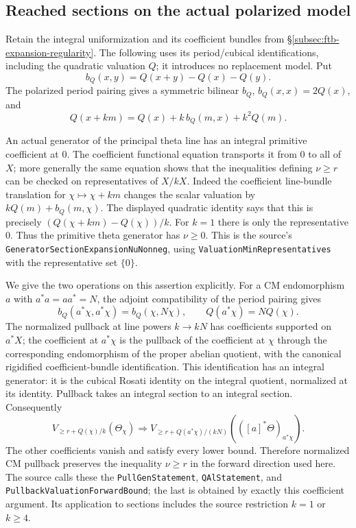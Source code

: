 \subsection{Reached sections on the actual polarized model}
\label{subsec:ftb-reached-sections}

Retain the integral uniformization and its coefficient bundles from
\S\ref{subsec:ftb-expansion-regularity}.
The following uses its period/cubical identifications, including the
quadratic valuation \(Q\); it introduces no replacement model.
Put
\[
 b_Q(x,y)=Q(x+y)-Q(x)-Q(y).
\]
The polarized period pairing gives a symmetric bilinear \(b_Q\),
\(b_Q(x,x)=2Q(x)\), and
\[
 Q(x+km)=Q(x)+k\,b_Q(m,x)+k^2Q(m).
\]

An actual generator of the principal theta line has an integral
primitive coefficient at \(0\).
The coefficient functional equation transports it from \(0\) to all
of \(X\); more generally the same equation shows that the inequalities
defining \(\nu\ge r\) can be checked on representatives of \(X/kX\).
Indeed the coefficient line-bundle translation for
\(\chi\mapsto\chi+km\) changes the scalar valuation by
\(kQ(m)+b_Q(m,\chi)\).  The displayed quadratic identity says that
this is precisely
\((Q(\chi+km)-Q(\chi))/k\).
For \(k=1\) there is only the representative \(0\).
Thus the primitive theta generator has \(\nu\ge0\).
This is the source's
\texttt{GeneratorSectionExpansionNuNonneg}, using
\texttt{ValuationMinRepresentatives} with the representative set
\(\{0\}\).

We give the two operations on this assertion explicitly.
For a CM endomorphism \(a\) with \(a^*a=aa^*=N\), the adjoint
compatibility of the period pairing gives
\[
 b_Q(a^*\chi,a^*\chi)=b_Q(\chi,N\chi),\qquad
                         Q(a^*\chi)=NQ(\chi).
\]
The normalized pullback at line powers \(k\to kN\) has coefficients
supported on \(a^*X\); the coefficient at \(a^*\chi\) is the
pullback of the coefficient at \(\chi\) through the corresponding
endomorphism of the proper abelian quotient, with the canonical
rigidified coefficient-bundle identification.
This identification has an integral generator: it is the cubical
Rosati identity on the integral quotient, normalized at its identity.
Pullback takes an integral section to an integral section.
Consequently
\[
 V_{\ge r+Q(\chi)/k}(\Theta_\chi)
 \Longrightarrow
 V_{\ge r+Q(a^*\chi)/(kN)}
                       (([a]^*\Theta)_{a^*\chi}).
\]
The other coefficients vanish and satisfy every lower bound.
Therefore normalized CM pullback preserves the inequality \(\nu\ge r\)
in the forward direction used here.
The source calls these the
\texttt{PullGenStatement}, \texttt{QAlStatement}, and
\texttt{PullbackValuationForwardBound};
the last is obtained by exactly this coefficient argument.
Its application to sections includes the source restriction
\(k=1\) or \(k\ge4\).

